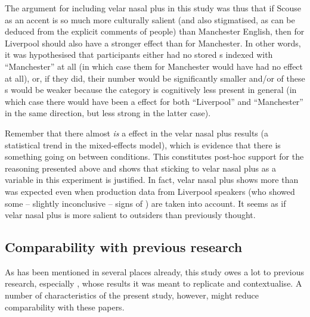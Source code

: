 The argument for including velar nasal plus in this study was thus that if Scouse as an accent is so much more culturally salient (and also stigmatised, as can be deduced from the explicit comments of people) than Manchester English, then  for Liverpool should also have a stronger effect than  for Manchester.
In other words, it was hypothesised that participants either had no stored s indexed with ``Manchester'' at all (in which case  them for Manchester would have had no effect at all), or, if they did, their number would be significantly smaller and/or  of these s would be weaker because the category is cognitively less present in general (in which case there would have been a  effect for both ``Liverpool'' and ``Manchester'' in the same direction, but less strong in the latter case).

Remember that there almost \emph{is} a  effect in the velar nasal plus results (a statistical trend in the mixed-effects model), which is evidence that there is something going on between  conditions.
This constitutes post-hoc support for the reasoning presented above and shows that sticking to velar nasal plus as a variable in this experiment is justified.
In fact, velar nasal plus shows more  than was expected even when production data from Liverpool speakers (who showed some -- slightly inconclusive -- signs of ) are taken into account.
It seems as if velar nasal plus is more salient to outsiders than previously thought.

		\subsection{Comparability with previous research}

As has been mentioned in several places already, this study owes a lot to previous research, especially \citealt{niedzielski1999,hayetal2006a,hayetal2006b,haydrager2010}, whose results it was meant to replicate and contextualise.
A number of characteristics of the present study, however, might reduce comparability with these papers.

